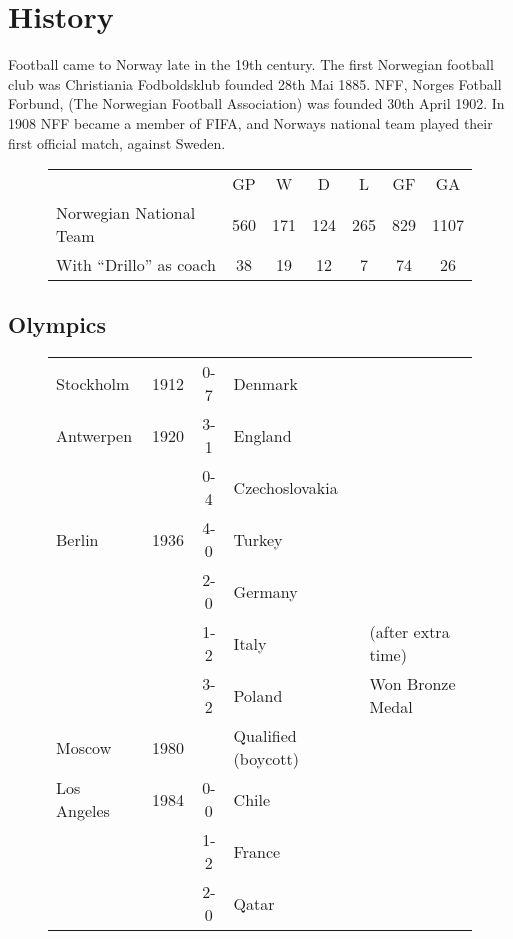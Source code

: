 \section{History}
Football came to Norway late in the 19th century. The first Norwegian football
club was Christiania Fodboldsklub founded 28th Mai 1885. NFF, Norges Fotball
Forbund, (The Norwegian Football Association) was founded 30th April 1902. In
1908 NFF became a member of FIFA, and Norways national team played their first
official match, against Sweden.
\begin{figure}[H]
\begin{tabular}{l c c c c c c}
& GP & W & D & L & GF & GA\\
Norwegian National Team & 560 & 171 & 124 & 265 & 829 & 1107 \\
With ``Drillo'' as coach & 38 & 19 & 12 & 7 & 74 & 26 \\
\end{tabular}
\end{figure}
\subsection{Olympics}
\begin{figure}[H]
\begin{tabular}{l c c l l}
Stockholm & 1912 & 0-7 & Denmark & \\
Antwerpen & 1920 & 3-1 & England & \\
& & 0-4 & Czechoslovakia & \\
Berlin & 1936 & 4-0 & Turkey & \\
& & 2-0 & Germany & \\
& & 1-2 & Italy & (after extra time) \\
& & 3-2 & Poland & Won Bronze Medal \\
Moscow & 1980 & & Qualified (boycott) \\
Los Angeles & 1984 & 0-0 & Chile & \\
& & 1-2 & France & \\
& & 2-0 & Qatar & \\
\end{tabular}
\end{figure}
